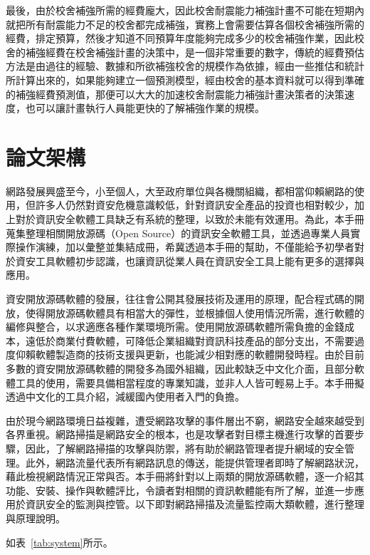 最後，由於校舍補強所需的經費龐大，因此校舍耐震能力補強計畫不可能在短期內就把所有耐震能力不足的校舍都完成補強，實務上會需要估算各個校舍補強所需的經費，排定預算，然後才知道不同預算年度能夠完成多少的校舍補強作業，因此校舍的補強經費在校舍補強計畫的決策中，是一個非常重要的數字，傳統的經費預估方法是由過往的經驗、數據和所欲補強校舍的規模作為依據，經由一些推估和統計所計算出來的，如果能夠建立一個預測模型，經由校舍的基本資料就可以得到準確的補強經費預測值，那便可以大大的加速校舍耐震能力補強計畫決策者的決策速度，也可以讓計畫執行人員能更快的了解補強作業的規模。

\section{論文架構}


網路發展興盛至今，小至個人，大至政府單位與各機關組織，都相當仰賴網路的使用，但許多人仍然對資安危機意識較低，針對資訊安全產品的投資也相對較少，加上對於資訊安全軟體工具缺乏有系統的整理，以致於未能有效運用。為此，本手冊蒐集整理相關開放源碼（Open Source）的資訊安全軟體工具，並透過專業人員實際操作演練，加以彙整並集結成冊，希冀透過本手冊的幫助，不僅能給予初學者對於資安工具軟體初步認識，也讓資訊從業人員在資訊安全工具上能有更多的選擇與應用。

資安開放源碼軟體的發展，往往會公開其發展技術及運用的原理，配合程式碼的開放，使得開放源碼軟體具有相當大的彈性，並根據個人使用情況所需，進行軟體的編修與整合，以求適應各種作業環境所需。使用開放源碼軟體所需負擔的金錢成本，遠低於商業付費軟體，可降低企業組織對資訊科技產品的部分支出，不需要過度仰賴軟體製造商的技術支援與更新，也能減少相對應的軟體開發時程。由於目前多數的資安開放源碼軟體的開發多為國外組織，因此較缺乏中文化介面，且部分軟體工具的使用，需要具備相當程度的專業知識，並非人人皆可輕易上手。本手冊擬透過中文化的工具介紹，減緩國內使用者入門的負擔。

由於現今網路環境日益複雜，遭受網路攻擊的事件層出不窮，網路安全越來越受到各界重視。網路掃描是網路安全的根本，也是攻擊者對目標主機進行攻擊的首要步驟，因此，了解網路掃描的攻擊與防禦，將有助於網路管理者提升網域的安全管理。此外，網路流量代表所有網路訊息的傳送，能提供管理者即時了解網路狀況，藉此檢視網路情況正常與否。本手冊將針對以上兩類的開放源碼軟體，逐一介紹其功能、安裝、操作與軟體評比，令讀者對相關的資訊軟體能有所了解，並進一步應用於資訊安全的監測與控管。以下即對網路掃描及流量監控兩大類軟體，進行整理與原理說明。
	
如表~\ref{tab:system}所示。 


